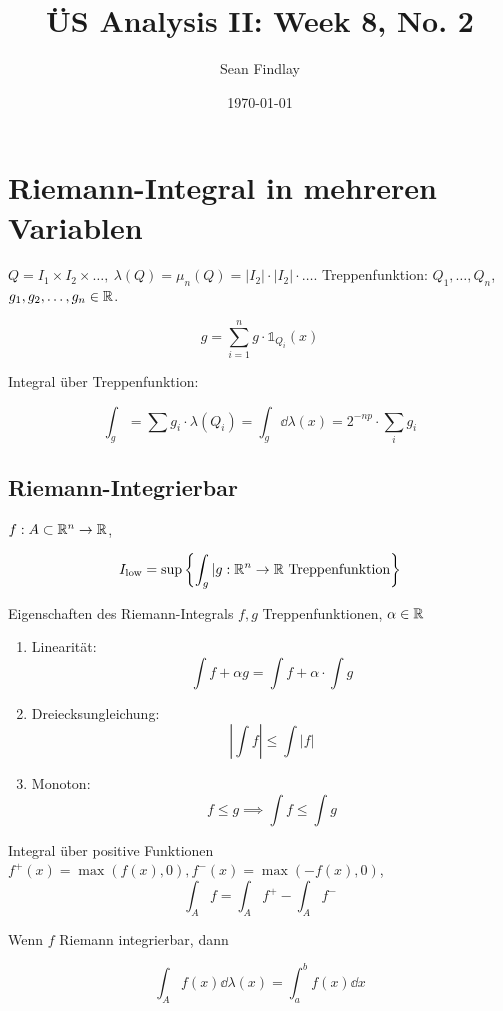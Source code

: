 \documentclass[12pt]{article}
\title{ÜS Analysis II: Week 8, No. 2}
\author{Sean Findlay}
\date{\today}
\begin{document}
\maketitle

\section{Riemann-Integral in mehreren Variablen}
$Q = I_1 \times I_2 \times \dots, \ \lambda(Q) = \mu_n(Q) = |I_2| \cdot |I_2| \cdot \dots$. 
Treppenfunktion: $Q_1, \dots, Q_n$, $g_1, g_2, \dots, g_n \in \mathbb{R}$.

$$
g = \sum_{i = 1}^{n} g \cdot \mathds{1}_{Q_i}(x)
$$

Integral über Treppenfunktion:

$$
    \int_g = \sum g_i \cdot \lambda(Q_i) = \int_g \dd \lambda(x) = 2^{-np}\cdot\sum_i g_i
$$

\subsection*{Riemann-Integrierbar}

$f: A \subset \mathbb{R}^n \rightarrow \mathbb{R}$, 

$$
    I_{\text{low}} = \sup \left\{\int_g | g: \mathbb{R}^n \rightarrow \mathbb{R} \text{ Treppenfunktion}\right\}
$$

\begin{remark}{Eigenschaften des Riemann-Integrals}{}
    $f, g$ Treppenfunktionen, $\alpha \in \mathbb{R}$

    \begin{enumerate}
        \item Linearität:
        $$
            \int f + \alpha g = \int f + \alpha \cdot \int g 
        $$
        \item Dreiecksungleichung:
        $$
            |\int f| \leq \int |f|
        $$
        \item Monoton:
        $$
            f \leq g \implies \int f \leq \int g
        $$
    \end{enumerate}
\end{remark}

\begin{remark}{Integral über positive Funktionen}{}
    $f^+(x) = \max(f(x), 0), f^-(x) = \max(-f(x), 0)$,
    $$
        \int_A f = \int_A f^+ - \int_A f^-
    $$

    Wenn $f$ Riemann integrierbar, dann

    $$
        \int_A f(x) \dd\lambda(x) = \int_{a}^{b} f(x) \dd x
    $$
\end{remark}
\end{document}
